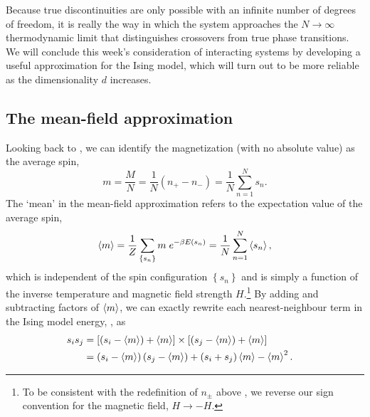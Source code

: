 Because true discontinuities are only possible with an infinite number of degrees of freedom, it is really the way in which the system approaches the $N \to \infty$ thermodynamic limit that distinguishes crossovers from true phase transitions.
We will conclude this week's consideration of interacting systems by developing a useful approximation for the Ising model, which will turn out to be more reliable as the dimensionality $d$ increases.



\subsection{The mean-field approximation}
Looking back to , we can identify the magnetization (with no absolute value) as the average spin,
\begin{equation*}
  m = \frac{M}{N} = \frac{1}{N}\left(n_+ - n_-\right) = \frac{1}{N} \sum_{n = 1}^N s_n.
\end{equation*}
The `mean' in the mean-field approximation refers to the expectation value of the average spin,
\begin{equation*}
  \left\langle m \right\rangle = \frac{1}{Z} \sum_{\left\{s_n\right\}} m \; e^{-\beta E(s_n)} = \frac{1}{N} \sum_{n = 1}^N \left\langle s_n \right\rangle,
\end{equation*}
which is independent of the spin configuration $\left\{s_n\right\}$ and is simply a function of the inverse temperature \be and magnetic field strength $H$.\footnote{To be consistent with the redefinition of $n_{\pm}$ above , we reverse our sign convention for the magnetic field, $H \to -H$.}
By adding and subtracting factors of $\left\langle m \right\rangle$, we can exactly rewrite each nearest-neighbour term in the Ising model energy, , as
\begin{align}
  s_i s_j & = \left[\left(s_i - \left\langle m \right\rangle\right) + \left\langle m \right\rangle\right] \times \left[\left(s_j - \left\langle m \right\rangle\right) + \left\langle m \right\rangle\right] \cr
          & = \left(s_i - \left\langle m \right\rangle\right) \left(s_j - \left\langle m \right\rangle\right) + \left(s_i + s_j\right)\left\langle m \right\rangle - \left\langle m \right\rangle^2. \label{eq:MF_start}
\end{align}

